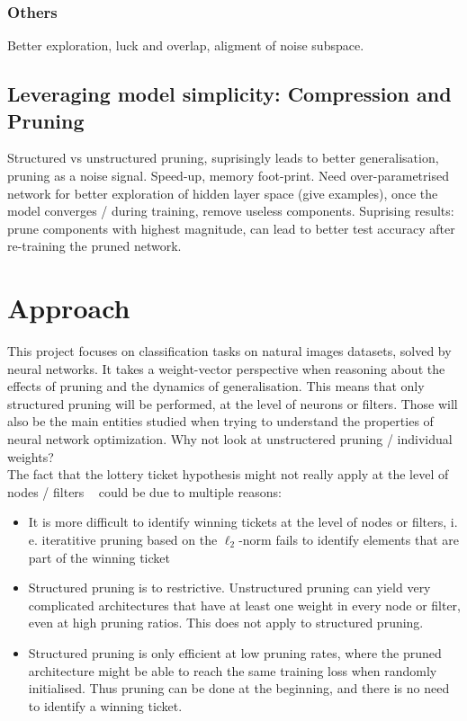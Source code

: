 \subsubsection*{Others}
Better exploration, luck and overlap, aligment of noise subspace.


\subsection{Leveraging model simplicity: Compression and Pruning}
Structured vs unstructured pruning, suprisingly leads to better generalisation, pruning as a noise signal. Speed-up, memory foot-print. Need over-parametrised network for better exploration of hidden layer space (give examples), once the model converges / during training, remove useless components. Suprising results: prune components with highest magnitude, can lead to better test accuracy after re-training the pruned network.

\section{Approach}

This project focuses on classification tasks on natural images datasets, solved by neural networks. It takes a weight-vector perspective when reasoning about the effects of pruning and the dynamics of generalisation. This means that only structured pruning will be performed, at the level of neurons or filters. Those will also be the main entities studied when trying to understand the properties of neural network optimization. Why not look at unstructered pruning / individual weights? \\

The fact that the lottery ticket hypothesis might not really apply at the level of nodes / filters ~\autocite{liu2018rethinking} could be due to multiple reasons:
\begin{itemize}
\item It is more difficult to identify winning tickets at the level of nodes or filters, i. e. iteratitive pruning based on the $\ell_2$-norm fails to identify elements that are part of the winning ticket
\item Structured pruning is to restrictive. Unstructured pruning can yield very complicated architectures that have at least one weight in every node or filter, even at high pruning ratios. This does not apply to structured pruning. 
\item Structured pruning is only efficient at low pruning rates, where the pruned architecture might be able to reach the same training loss when randomly initialised. Thus pruning can be done at the beginning, and there is no need to identify a winning ticket.
\end{itemize}

